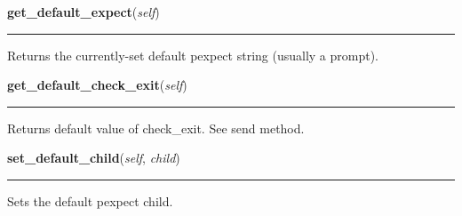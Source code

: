     \label{shutit_global:ShutIt:get_default_expect}

    \vspace{0.5ex}

\hspace{.8\funcindent}\begin{boxedminipage}{\funcwidth}

    \raggedright \textbf{get\_default\_expect}(\textit{self})

    \vspace{-1.5ex}

    \rule{\textwidth}{0.5\fboxrule}
\setlength{\parskip}{2ex}
    Returns the currently-set default pexpect string (usually a prompt).

\setlength{\parskip}{1ex}
    \end{boxedminipage}

    \label{shutit_global:ShutIt:get_default_check_exit}

    \vspace{0.5ex}

\hspace{.8\funcindent}\begin{boxedminipage}{\funcwidth}

    \raggedright \textbf{get\_default\_check\_exit}(\textit{self})

    \vspace{-1.5ex}

    \rule{\textwidth}{0.5\fboxrule}
\setlength{\parskip}{2ex}
    Returns default value of check\_exit. See send method.

\setlength{\parskip}{1ex}
    \end{boxedminipage}

    \label{shutit_global:ShutIt:set_default_child}

    \vspace{0.5ex}

\hspace{.8\funcindent}\begin{boxedminipage}{\funcwidth}

    \raggedright \textbf{set\_default\_child}(\textit{self}, \textit{child})

    \vspace{-1.5ex}

    \rule{\textwidth}{0.5\fboxrule}
\setlength{\parskip}{2ex}
    Sets the default pexpect child.

\setlength{\parskip}{1ex}
    \end{boxedminipage}

